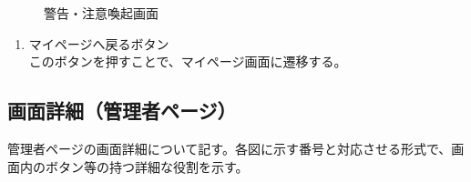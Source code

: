 \documentclass[a4j]{jarticle}
\begin{document}
\begin{figure}[H]
\centering
{}
\caption{警告・注意喚起画面}
\label{fig:read_warning}
\end{figure}
\begin{enumerate}
  \renewcommand{\labelenumi}{\textcircled{\scriptsize \theenumi}}

  \item マイページへ戻るボタン\\
  このボタンを押すことで、マイページ画面に遷移する。
\end{enumerate}

\subsection{画面詳細（管理者ページ）}
管理者ページの画面詳細について記す。各図に示す番号と対応させる形式で、画面内のボタン等の持つ詳細な役割を示す。
\end{document}
